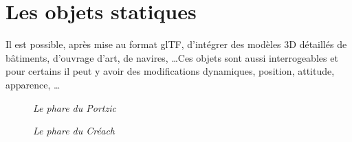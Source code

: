 \section{Les objets statiques}
Il est possible, après mise au format glTF, d'intégrer des modèles 3D détaillés de bâtiments, d'ouvrage d'art, de navires, \ldots Ces objets sont aussi interrogeables et pour certains il peut y avoir des modifications dynamiques, position, attitude, apparence, \ldots
\begin{center}
\begin{figure}[ht]
\caption{\label{equiProj}\textit{Le phare du Portzic}}
\end{figure}
\end{center}
\begin{center}
\begin{figure}[ht]
\caption{\label{equiProj}\textit{Le phare du Créach}}
\end{figure}
\end{center}
